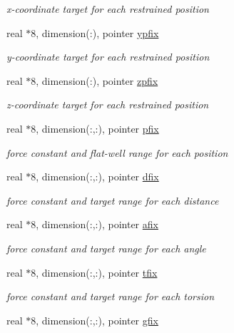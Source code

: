 \begin{DoxyCompactItemize}
\begin{DoxyCompactList}\small\item\em x-\/coordinate target for each restrained position \end{DoxyCompactList}\item 
real $\ast$8, dimension(\-:), pointer \hyperlink{classkgeoms_aa91e2cdd75365eab73918fbbdd6b18fb}{ypfix}
\begin{DoxyCompactList}\small\item\em y-\/coordinate target for each restrained position \end{DoxyCompactList}\item 
real $\ast$8, dimension(\-:), pointer \hyperlink{classkgeoms_a5b73b12755cab58ec5104cd43a770b07}{zpfix}
\begin{DoxyCompactList}\small\item\em z-\/coordinate target for each restrained position \end{DoxyCompactList}\item 
real $\ast$8, dimension(\-:,\-:), pointer \hyperlink{classkgeoms_ac883263077bf175682f2528e8a700021}{pfix}
\begin{DoxyCompactList}\small\item\em force constant and flat-\/well range for each position \end{DoxyCompactList}\item 
real $\ast$8, dimension(\-:,\-:), pointer \hyperlink{classkgeoms_a3fd45aae33139298589f66472ad1b9ca}{dfix}
\begin{DoxyCompactList}\small\item\em force constant and target range for each distance \end{DoxyCompactList}\item 
real $\ast$8, dimension(\-:,\-:), pointer \hyperlink{classkgeoms_a577094db0304329d243bc55bc9cec50f}{afix}
\begin{DoxyCompactList}\small\item\em force constant and target range for each angle \end{DoxyCompactList}\item 
real $\ast$8, dimension(\-:,\-:), pointer \hyperlink{classkgeoms_ab092f71a62d6b06032a5972815c2fb23}{tfix}
\begin{DoxyCompactList}\small\item\em force constant and target range for each torsion \end{DoxyCompactList}\item 
real $\ast$8, dimension(\-:,\-:), pointer \hyperlink{classkgeoms_a61e4432d014ac7a31221f573b201c84d}{gfix}

\end{DoxyCompactItemize}
